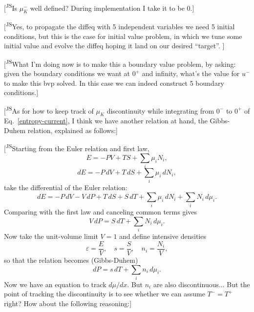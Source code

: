 \documentclass[11pt]{article}
\newcommand{\JScom}[1]{\textsf{\color{violet} [\textsuperscript{JS}#1]}}
\begin{document}
\JScom{Is $\mu_K^-$ well defined? During implementation I take it to be 0.}


\iffalse
\JScom{Yes, to propagate the diffeq with 5 independent variables we need 5 initial conditions, but this is the case for initial value problem, in which we tune some initial value and evolve the diffeq hoping it land on our desired ``target''. }

\JScom{What I'm doing now is to make this a boundary value problem, by asking: given the boundary conditions we want at $0^+$ and infinity, what's the value for $u^-$ to make this bvp solved. In this case we can indeed construct 5 boundary conditions.}

\JScom{As for how to keep track of $\mu_K$ discontinuity while integrating from $0^-$ to $0^+$ of Eq.~\eqref{entropy-current}, I think we have another relation at hand, the Gibbs-Duhem relation, explained as follows:}

\JScom{Starting from the Euler relation and first law,
$$
E=-PV+TS+\sum_i \mu_i N_i,
$$
$$
dE=-P\,dV+T\,dS+\sum_i \mu_i\,dN_i,
$$
take the differential of the Euler relation:
$$
dE=-P\,dV - V\,dP + T\,dS + S\,dT + \sum_i \mu_i\,dN_i + \sum_i N_i\,d\mu_i.
$$
Comparing with the first law and canceling common terms gives
$$
V\,dP=S\,dT+\sum_i N_i\,d\mu_i.
$$
Now take the unit-volume limit $V=1$ and define intensive densities
$$
\varepsilon=\frac{E}{V},\quad s=\frac{S}{V},\quad n_i=\frac{N_i}{V},
$$
so that the relation becomes (Gibbs-Duhem)
$$
dP=s\,dT+\sum_i n_i\,d\mu_i.
$$
Now we have an equation to track $d\mu/dx$. But $n_i$ are also discontinuous... But the point of tracking the discontinuity is to see whether we can assume $T^- = T^+$ right? How about the following reasoning:}
\end{document}
